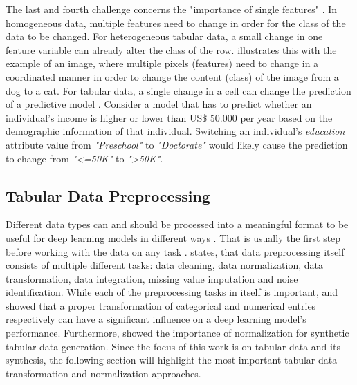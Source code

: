 The last and fourth challenge concerns the "importance of single features" \cite[p. 4]{borisov2022DeepNeuralNetworks}. 
In homogeneous data, multiple features need to change in order for the class of the data to be changed. 
For heterogeneous tabular data, a small change in one feature variable can already alter the class of the row. 
\textcite{borisov2022DeepNeuralNetworks} illustrates this with the example of an image, where multiple pixels (\ie features) need to change in a coordinated manner in order to change the content (\ie class) of the image from a dog to a cat.
For tabular data, a single change in a cell can change the prediction of a predictive \gls{model} \cite{borisov2022DeepNeuralNetworks}. 
Consider a \gls{model} that has to predict whether an individual's income is higher or lower than US\$ 50.000 per year \cite{Dua:2019} based on the demographic information of that individual.
Switching an individual's \textit{education} attribute value from \textit{"Preschool"} to \textit{"Doctorate"} would likely cause the prediction to change from \textit{"<=50K"} to \textit{">50K"}.


\subsection{Tabular Data Preprocessing}
\label{sec:preprocessing}

Different data types can and should be processed into a meaningful format to be useful for deep learning models in different ways \cite{fan2020RelationalDataSynthesisa, lederrey2022DATGANIntegratingExperta}.
That is usually the first step before working with the data on any task \cite{izonin2022TwoStepDataNormalization}.
\textcite{garcia2016BigDataPreprocessing} states, that data preprocessing itself consists of multiple different tasks: data cleaning, data normalization, data transformation, data integration, missing value imputation and noise identification.
While each of the preprocessing tasks in itself is important, 
\textcite{fitkov-norris2012EvaluatingImpactCategorical} and \textcite{gorishniy2022EmbeddingsNumericalFeatures} showed that a proper transformation of categorical and numerical entries respectively can have a significant influence on a deep learning \gls{model}'s performance.
Furthermore, \textcite{xu2019ModelingTabularData} showed the importance of normalization for synthetic tabular data generation.
Since the focus of this work is on tabular data and its synthesis, the following section will highlight the most important tabular data transformation and normalization approaches.

